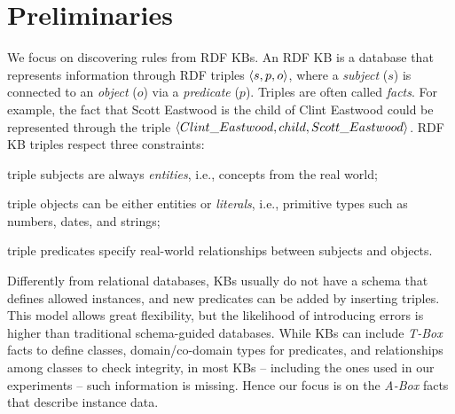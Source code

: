 \vspace{-1ex}
\section{Preliminaries}%
\label{sec:krd_prel}
\vspace{-0.2ex}
We focus on discovering rules from RDF KBs. An RDF KB is
a database that represents information through RDF triples $\langle s,p,o\rangle$, where a \emph{subject} ($s$) is connected to an \emph{object} ($o$) via a \emph{predicate} ($p$). Triples are often called \emph{facts}. For example, the fact that Scott Eastwood is the child of Clint Eastwood could be represented through the triple $\langle Clint\_Eastwood,child,Scott\_Eastwood\rangle$. 
RDF KB triples respect three constraints:
\begin{inparaenum}[(i)]
	\item triple subjects are always \emph{entities}, i.e., concepts from the real world;
	\item triple objects can be either entities or \emph{literals}, i.e.,  primitive types such as numbers, dates, and strings;
	\item triple predicates specify real-world relationships between subjects and objects.
\end{inparaenum}

Differently from relational databases, KBs usually do not have a schema that defines allowed instances,
and new predicates can be added by inserting triples. %
This model allows great flexibility, but the likelihood of introducing errors is higher than traditional schema-guided databases.
While KBs can include \emph{T-Box} facts to define classes, domain/co-domain types for predicates, and relationships among classes
to check integrity, in most KBs -- including the ones used in our experiments -- such information is missing. %
Hence our focus is on the \emph{A-Box} facts that describe instance data. 

\vspace{-1ex}
